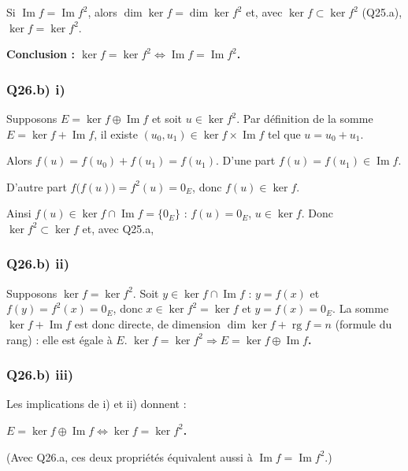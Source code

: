 \documentclass[11pt,a4paper]{article}
\newcommand{\equationajustee}[1]{%
  \sbox{\boiteequation}{$\displaystyle #1$}%
  \ifdim\wd\boiteequation>\linewidth
    \[\resizebox{\linewidth}{!}{\usebox{\boiteequation}}\]%
  \else
    \[#1\]%
  \fi}
\begin{document}
Si \(\operatorname{Im}f=\operatorname{Im}f^2\), alors \(\dim\ker f=\dim\ker f^2\) et, avec \(\ker f\subset\ker f^2\) (Q25.a), \(\ker f=\ker f^2\).

\textbf{Conclusion : \(\ker f=\ker f^2\iff\operatorname{Im}f=\operatorname{Im}f^2\).}

\hypertarget{q26.b-i}{%
\subsubsection{Q26.b) i)}\label{q26.b-i}}

Supposons \(E=\ker f\oplus\operatorname{Im}f\) et soit \(u\in\ker f^2\). Par définition de la somme \(E=\ker f+\operatorname{Im}f\), il existe \((u_0,u_1)\in\ker f\times\operatorname{Im}f\) tel que \(u=u_0+u_1\).

Alors \(f(u)=f(u_0)+f(u_1)=f(u_1)\). D'une part \(f(u)=f(u_1)\in\operatorname{Im}f\).

D'autre part \(f\big(f(u)\big)=f^2(u)=0_E\), donc \(f(u)\in\ker f\).

Ainsi \(f(u)\in\ker f\cap\operatorname{Im}f=\{0_E\}\) : \(f(u)=0_E\), \textbf{\(u\in\ker f\)}. Donc \(\ker f^2\subset\ker f\) et, avec Q25.a,
\equationajustee{\boxed{\ker f=\ker f^2}.}

\hypertarget{q26.b-ii}{%
\subsubsection{Q26.b) ii)}\label{q26.b-ii}}

Supposons \(\ker f=\ker f^2\). Soit \(y\in\ker f\cap\operatorname{Im}f\) : \(y=f(x)\) et \(f(y)=f^2(x)=0_E\), donc \(x\in\ker f^2=\ker f\) et \(y=f(x)=0_E\).
\equationajustee{\boxed{\ker f\cap\operatorname{Im}f=\{0_E\}}.}
La somme \(\ker f+\operatorname{Im}f\) est donc directe, de dimension \(\dim\ker f+\operatorname{rg}f=n\) (formule du rang) : elle est égale à \(E\). \textbf{\(\ker f=\ker f^2\Rightarrow E=\ker f\oplus\operatorname{Im}f\).}

\hypertarget{q26.b-iii}{%
\subsubsection{Q26.b) iii)}\label{q26.b-iii}}

Les implications de i) et ii) donnent :

\textbf{\(E=\ker f\oplus\operatorname{Im}f\iff\ker f=\ker f^2\).}

(Avec Q26.a, ces deux propriétés équivalent aussi à \(\operatorname{Im}f=\operatorname{Im}f^2\).)
\end{document}
